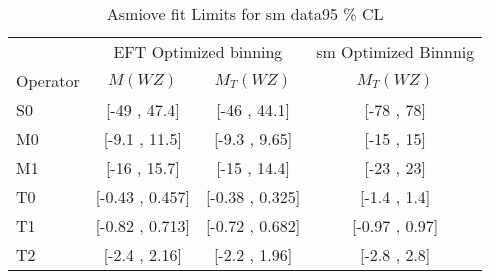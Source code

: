 \documentclass[../Bachelorarbeit.tex]{subfiles}
\begin{document}
\label{sec:SM_Limits}

\begin{table}
    \centering
    \begin{tabular}{l | c c | c }
        \hline
                 & \multicolumn{2}{c|}{EFT Optimized binning} & \acrshort{sm} Optimized Binnnig                  \\
        Operator & $M(WZ)$                                    & $M_{T}(WZ)$                     & $M_{T}(WZ)$    \\
        \hline
        S0       & [-49 , 47.4]                               & [-46 , 44.1]                    & [-78 , 78]     \\
        M0       & [-9.1 , 11.5]                              & [-9.3 , 9.65]                   & [-15 , 15]     \\
        M1       & [-16 , 15.7]                               & [-15 , 14.4]                    & [-23 , 23]     \\
        T0       & [-0.43 , 0.457]                            & [-0.38 , 0.325]                 & [-1.4 , 1.4]   \\
        T1       & [-0.82 , 0.713]                            & [-0.72 , 0.682]                 & [-0.97 , 0.97] \\
        T2       & [-2.4 , 2.16]                              & [-2.2 , 1.96]                   & [-2.8 , 2.8]   \\
        \hline
    \end{tabular}
    \caption{Asmiove fit Limits for \acrshort{sm} data95 \% CL }
    \label{tab:asimov}
\end{table}
\end{document}

